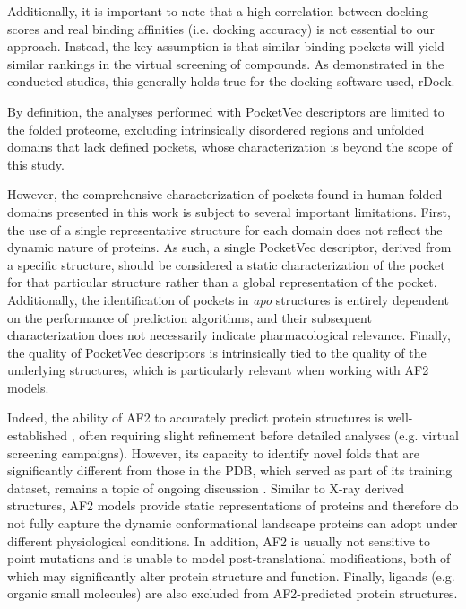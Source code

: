 Additionally, it is important to note that a high correlation between docking scores and real binding affinities (i.e. docking accuracy) is not essential to our approach. Instead, the key assumption is that similar binding pockets will yield similar rankings in the virtual screening of compounds. As demonstrated in the conducted studies, this generally holds true for the docking software used, rDock.

By definition, the analyses performed with PocketVec descriptors are limited to the folded proteome, excluding intrinsically disordered regions and unfolded domains that lack defined pockets, whose characterization is beyond the scope of this study. 


However, the comprehensive characterization of pockets found in human folded domains presented in this work is subject to several important limitations. First, the use of a single representative structure for each domain does not reflect the dynamic nature of proteins. As such, a single PocketVec descriptor, derived from a specific structure, should be considered a static characterization of the pocket for that particular structure rather than a global representation of the pocket. Additionally, the identification of pockets in \textit{apo} structures is entirely dependent on the performance of prediction algorithms, and their subsequent characterization does not necessarily indicate pharmacological relevance. Finally, the quality of PocketVec descriptors is intrinsically tied to the quality of the underlying structures, which is particularly relevant when working with AF2 models.

Indeed, the ability of AF2 to accurately predict protein structures is well-established \cite{jumper_highly_2021, tunyasuvunakool_highly_2021}, often requiring slight refinement before detailed analyses (e.g. virtual screening campaigns)\cite{zhang_benchmarking_2023, holcomb_evaluation_2023, scardino_how_2023}. However, its capacity to identify novel folds that are significantly different from those in the PDB, which served as part of its training dataset, remains a topic of ongoing discussion \cite{akdel_structural_2022}. Similar to X-ray derived structures, AF2 models provide static representations of proteins and therefore do not fully capture the dynamic conformational landscape proteins can adopt under different physiological conditions. In addition, AF2 is usually not sensitive to point mutations and is unable to model post-translational modifications, both of which may significantly alter protein structure and function. Finally, ligands (e.g. organic small molecules) are also excluded from AF2-predicted protein structures. 

